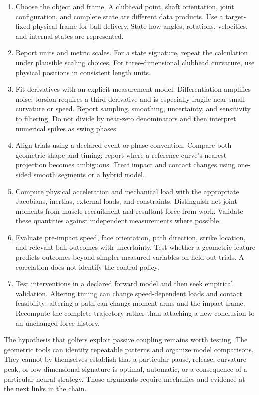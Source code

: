 \documentclass[12pt, openany]{book}
\theoremstyle{plain}
\begin{document}
\begin{enumerate}
\item Choose the object and frame. A clubhead point, shaft orientation,
   joint configuration, and complete state are different data products.
   Use a target-fixed physical frame for ball delivery. State how angles,
   rotations, velocities, and internal states are represented.
\item Report units and metric scales. For a state signature, repeat the
   calculation under plausible scaling choices. For three-dimensional
   clubhead curvature, use physical positions in consistent length units.
\item Fit derivatives with an explicit measurement model. Differentiation
   amplifies noise; torsion requires a third derivative and is especially
   fragile near small curvature or speed. Report sampling, smoothing,
   uncertainty, and sensitivity to filtering. Do not divide by near-zero
   denominators and then interpret numerical spikes as swing phases.
\item Align trials using a declared event or phase convention. Compare both
   geometric shape and timing; report where a reference curve's nearest
   projection becomes ambiguous. Treat impact and contact changes using
   one-sided smooth segments or a hybrid model.
\item Compute physical acceleration and mechanical load with the appropriate
   Jacobians, inertias, external loads, and constraints. Distinguish net
   joint moments from muscle recruitment and resultant force from work.
   Validate these quantities against independent measurements where possible.
\item Evaluate pre-impact speed, face orientation, path direction, strike
   location, and relevant ball outcomes with uncertainty. Test whether a
   geometric feature predicts outcomes beyond simpler measured variables
   on held-out trials. A correlation does not identify the control policy.
\item Test interventions in a declared forward model and then seek empirical
   validation. Altering timing can change speed-dependent loads and contact
   feasibility; altering a path can change moment arms and the impact frame.
   Recompute the complete trajectory rather than attaching a new conclusion
   to an unchanged force history.
\end{enumerate}

The hypothesis that golfers exploit passive coupling remains worth testing.
The geometric tools can identify repeatable patterns and organize model
comparisons. They cannot by themselves establish that a particular pause,
release, curvature peak, or low-dimensional signature is optimal, automatic,
or a consequence of a particular neural strategy. Those arguments require
mechanics and evidence at the next links in the chain.
\end{document}
